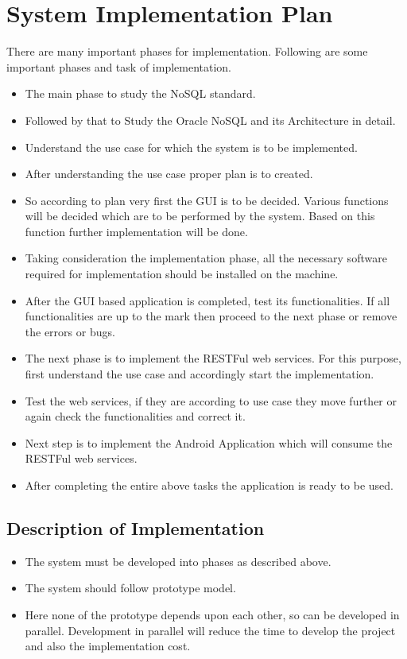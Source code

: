 \section{System Implementation Plan}
There are many important phases for implementation. Following are some important phases and task of implementation.
\begin{itemize}
  \item The main phase to study the NoSQL standard.
  \item Followed by that to Study the Oracle NoSQL and its Architecture in detail.
  \item Understand the use case for which the system is to be implemented.
  \item After understanding the use case proper plan is to created.
  \item So according to plan very first the GUI is to be decided. Various functions will be decided which are to be performed by the system. Based on this function further implementation will be done.
  \item Taking consideration the implementation phase, all the necessary software required for implementation should be installed on the machine.
  \item After the GUI based application is completed, test its functionalities. If all functionalities are up to the mark then proceed to the next phase or remove the errors or bugs.
  \item The next phase is to implement the RESTFul web services. For this purpose, first understand the use case and accordingly start the implementation.
  \item Test the web services, if they are according to use case they move further or again check the functionalities and correct it.
  \item Next step is to implement the Android Application which will consume the RESTFul web services.
  \item After completing the entire above tasks the application is ready to be used.
\end{itemize}

\subsection{Description of Implementation}
\begin{itemize}
  \item The system must be developed into phases as described above.
  \item The system should follow prototype model.
  \item Here none of the prototype depends upon each other, so can be developed in parallel. Development in parallel will reduce the time to develop the project and also the implementation cost.
\end{itemize}

